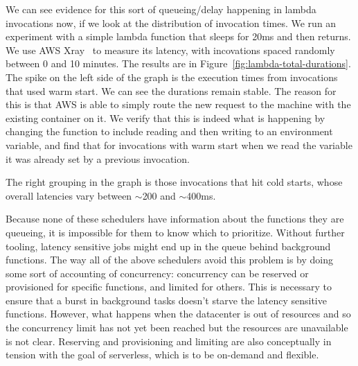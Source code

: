 We can see evidence for this sort of queueing/delay happening in lambda
invocations now, if we look at the distribution of invocation times. We run an
experiment with a simple lambda function that sleeps for 20ms and then returns.
We use AWS Xray~\cite{aws-xray} to measure its latency, with incovations spaced
randomly between 0 and 10 minutes. The results are in
Figure~\ref{fig:lambda-total-durations}. The spike on the left side of the graph
is the execution times from invocations that used warm start. We can see the
durations remain stable. The reason for this is that AWS is able to simply route
the new request to the machine with the existing container on it. We verify that
this is indeed what is happening by changing the function to include reading and
then writing to an environment variable, and find that for invocations with warm
start when we read the variable it was already set by a previous
invocation.

The right grouping in the graph is those invocations that hit cold starts, whose
overall latencies vary between $\sim$200 and $\sim$400ms.

Because none of these schedulers have information about the functions they are
queueing, it is impossible for them to know which to prioritize. Without further
tooling, latency sensitive jobs might end up in the queue behind background
functions. The way all of the above schedulers avoid this problem is by doing
some sort of accounting of concurrency: concurrency can be reserved or
provisioned for specific functions, and limited for others. This is necessary to
ensure that a burst in background tasks doesn't starve the latency sensitive
functions. However, what happens when the datacenter is out of resources and so
the concurrency limit has not yet been reached but the resources are unavailable
is not clear. Reserving and provisioning and limiting are also conceptually in
tension with the goal of serverless, which is to be on-demand and flexible.




